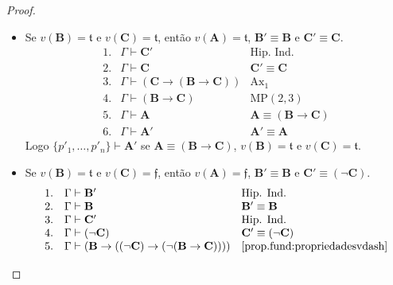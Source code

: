 \begin{proof}
\begin{enumerate}[label=\roman*.]
\begin{itemize}
                    Logo $\{p'_1, \ldots, p'_n \} \vdash \mathbf{A}'$ se $\mathbf{A} \equiv (\mathbf{B} \rightarrow \mathbf{C})$ e $v(\mathbf{B}) = \mathfrak{f}$.
                    \item Se $v(\mathbf{B}) = \mathfrak{t}$ e $v(\mathbf{C}) = \mathfrak{t}$, então $v(\mathbf{A}) = \mathfrak{t}$, $\mathbf{B}' \equiv \mathbf{B}$ e $\mathbf{C}' \equiv \mathbf{C}$.
                        \[
                            \begin{array}{rll}
                                1. & \Gamma \vdash \mathbf{C}' & \text{Hip. Ind.} \\
                                2. & \Gamma \vdash \mathbf{C} & \mathbf{C}' \equiv \mathbf{C} \\
                                3. & \Gamma \vdash (\mathbf{C} \rightarrow (\mathbf{B} \rightarrow \mathbf{C})) & \mathrm{Ax}_1 \\
                                4. & \Gamma \vdash (\mathbf{B} \rightarrow \mathbf{C}) & \text{MP}(2,3) \\
                                5. & \Gamma \vdash \mathbf{A} & \mathbf{A} \equiv \mathbf{(\mathbf{B} \rightarrow \mathbf{C})} \\
                                6. & \Gamma \vdash \mathbf{A}' & \mathbf{A}' \equiv \mathbf{A}
                            \end{array}
                        \]
                    Logo $\{p'_1, \ldots, p'_n \} \vdash \mathbf{A}'$ se $\mathbf{A} \equiv (\mathbf{B} \rightarrow \mathbf{C})$, $v(\mathbf{B}) = \mathfrak{t}$ e $v(\mathbf{C}) = \mathfrak{t}$.
                    \item Se $v(\mathbf{B}) = \mathfrak{t}$ e $v(\mathbf{C}) = \mathfrak{f}$, então $v(\mathbf{A}) = \mathfrak{f}$, $\mathbf{B}' \equiv \mathbf{B}$ e $\mathbf{C}' \equiv (\neg \mathbf{C})$.
                        \[
                            \begin{array}{rll}
                                1. & \Gamma \vdash \mathbf{B}' & \text{Hip. Ind.} \\
                                2. & \Gamma \vdash \mathbf{B} & \mathbf{B}' \equiv \mathbf{B} \\
                                3. & \Gamma \vdash \mathbf{C}' & \text{Hip. Ind.} \\
                                4. & \Gamma \vdash (\neg \mathbf{C}) & \mathbf{C}' \equiv (\neg \mathbf{C}) \\
                                5. & \Gamma \vdash (\mathbf{B} \rightarrow ((\neg \mathbf{C}) \rightarrow (\neg (\mathbf{B} \rightarrow \mathbf{C})))) & \eqref{prop.fund:propriedadesvdash} \\

\end{array}\]
\end{itemize}
\end{enumerate}
\end{proof}
